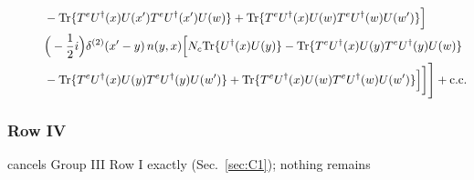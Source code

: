 \begin{align}
&\qquad\quad -{\rm Tr}\{T^{e}U^{\dagger}(x)U(x')T^{e}U^{\dagger}(x')U(w)\}+{\rm Tr}\{T^{e}U^{\dagger}(x)U(w)T^{e}U^{\dagger}(w)U(w')\}\Big]\notag\\
&\qquad\quad \Big(-\frac{1}{2}i\Big)\delta^{(2)}(x'-y)\,n(y,x)\Big[N_{c}{\rm Tr}\{U^{\dagger}(x)U(y)\}-{\rm Tr}\{T^{e}U^{\dagger}(x)U(y)T^{e}U^{\dagger}(y)U(w)\}\notag\\
&\qquad\quad -{\rm Tr}\{T^{e}U^{\dagger}(x)U(y)T^{e}U^{\dagger}(y)U(w')\}+{\rm Tr}\{T^{e}U^{\dagger}(x)U(w)T^{e}U^{\dagger}(w)U(w')\}\Big]\bigg]\Bigg]+{\rm c.c.}\label{eq:E-I.IIIdN-2}
\end{align}
\subsubsection*{Row IV}
cancels Group III Row I exactly (Sec.~\ref{sec:C1}); nothing remains
